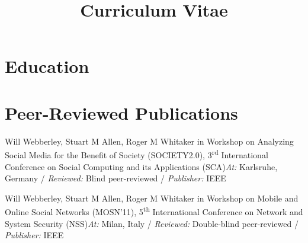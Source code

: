\documentclass[11pt,a4paper,sans]{moderncv} %
\title{Curriculum Vitae}
\begin{document}
\makecvtitle %


\section{Education}



\section{Peer-Reviewed Publications}
		{\newline Will Webberley, Stuart M Allen, Roger M Whitaker}
		{\newline in Workshop on Analyzing Social Media for the Benefit of Society (SOCIETY2.0), 3\textsuperscript{rd} International Conference on Social Computing and its Applications (SCA)}{}{\textit{At:} Karlsruhe, Germany / \textit{Reviewed:} Blind peer-reviewed / \textit{Publisher:} IEEE}
	
		{\newline Will Webberley, Stuart M Allen, Roger M Whitaker}
		{\newline in Workshop on Mobile and Online Social Networks (MOSN'11), 5\textsuperscript{th} International Conference on Network and System Security (NSS)}{}{\textit{At:} Milan, Italy / \textit{Reviewed:} Double-blind peer-reviewed / \textit{Publisher:} IEEE}
\end{document}
